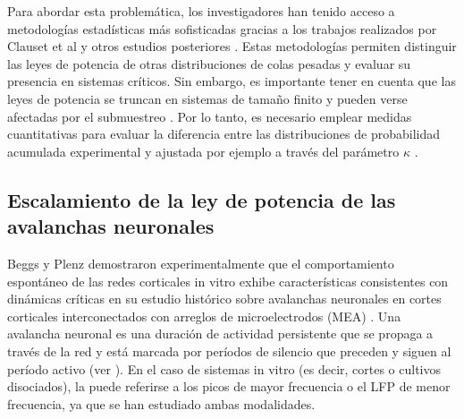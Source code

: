 Para abordar esta problemática, los investigadores han tenido acceso a metodologías estadísticas más sofisticadas gracias a los trabajos realizados por Clauset et al  \cite{clauset_power-law_2009} y otros estudios posteriores \cite{klaus_statistical_2011,markovic_power_2014}. Estas metodologías permiten distinguir las leyes de potencia de otras distribuciones de colas pesadas y evaluar su presencia en sistemas críticos. Sin embargo, es importante tener en cuenta que las leyes de potencia se truncan en sistemas de tamaño finito \cite{bonachela_self-organization_2010} y pueden verse afectadas por el submuestreo \cite{ribeiro_undersampled_2014}. Por lo tanto, es necesario emplear medidas cuantitativas para evaluar la diferencia entre las distribuciones de probabilidad acumulada experimental y ajustada por ejemplo  a través del parámetro $\kappa$ \cite{shew_neuronal_2009}.



\subsection{Escalamiento de  la ley de potencia de las avalanchas neuronales }

Beggs y Plenz demostraron experimentalmente que el comportamiento espontáneo de las redes corticales in vitro exhibe características consistentes con dinámicas críticas en su estudio histórico sobre avalanchas neuronales en cortes corticales interconectados con arreglos de microelectrodos (\gls{MEA}) \cite{beggs_neuronal_2003} . Una avalancha neuronal es una duración de actividad persistente que se propaga a través de la red y está marcada por períodos de silencio que preceden y siguen al período activo (ver ). En el caso de sistemas in vitro (es decir, cortes o cultivos disociados), la  puede referirse a los picos de mayor frecuencia o el \gls{LFP} de menor frecuencia, ya que se han estudiado ambas modalidades.

